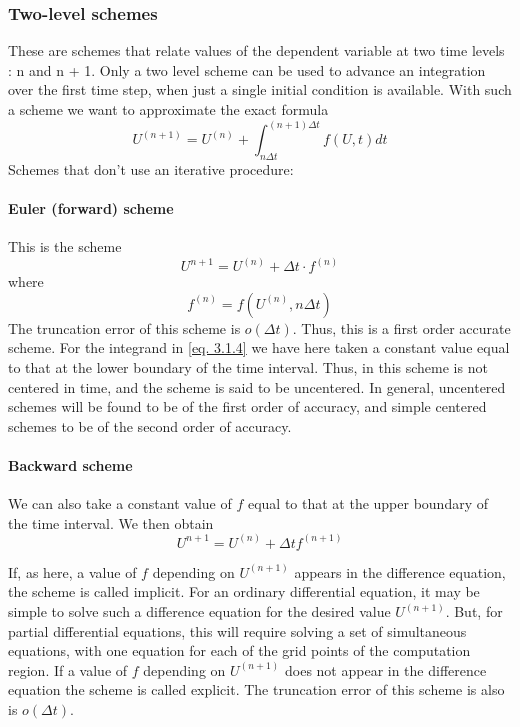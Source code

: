 \subsubsection{Two-level schemes}
These are schemes that relate values of the dependent variable at two time levels : n and n + 1. Only a two level scheme can be used to advance an integration over the first time step, when just a single initial condition is available. With such a scheme we want to approximate the exact formula
\begin{equation}\label{eq. 3.1.4}
    U^{(n+1)}=U^{(n)}+\int_{n\Delta t}^{(n+1)\Delta t}f(U,t)dt
\end{equation}
Schemes that don't use an iterative procedure:
\paragraph{Euler (forward) scheme}
This is the scheme 
\begin{equation}\label{3.1.5}
    U^{n+1}=U^{(n)}+\Delta t\cdot f^{(n)}
\end{equation}
where
$$f^{(n)}=f\left(U^{(n)},n\Delta t\right)$$
The truncation error of this scheme is $o(\Delta t)$. Thus, this is a first order accurate scheme. For the integrand in \ref{eq. 3.1.4} we have here taken a constant value equal to that at the lower boundary of the time interval. Thus, in this scheme is not centered in time, and the scheme is said to be uncentered. In general, uncentered schemes will be found to be of the first order of accuracy, and simple centered schemes to be of the second order of accuracy.
\paragraph{Backward scheme}
We can also take a constant value of $f$ equal to that at the upper boundary of the time interval. We then obtain
\begin{equation}\label{3.1.6}
     U^{n+1}=U^{(n)}+\Delta t f^{(n+1)}
\end{equation}

If, as here, a value of $f$ depending on $U^{(n+1)}$ appears in the difference equation, the scheme is called implicit. For an ordinary differential equation, it may be simple to solve such a difference equation for the desired value $U^{(n+1)}$. But, for partial differential equations, this will require solving a set of simultaneous equations, with one equation for each of the grid points of the computation region. If a value of $f$ depending on $U^{(n+1)}$ does not appear in the difference equation the scheme is called explicit. The truncation error of this scheme is also is $o(\Delta t)$.
